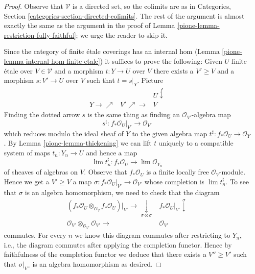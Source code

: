 \begin{proof}

Observe that $\mathcal{V}$ is a directed set, so the colimits are
as in Categories, Section \ref{categories-section-directed-colimits}.
The rest of the argument is almost exactly the same as the argument
in the proof of Lemma \ref{pione-lemma-restriction-fully-faithful}; we urge
the reader to skip it.

\medskip\noindent
Since the category of finite \'etale coverings has an
internal hom (Lemma \ref{pione-lemma-internal-hom-finite-etale})
it suffices to prove the following: Given $U$ finite \'etale over
$V \in \mathcal{V}$
and a morphism $t : Y \to U$ over $V$ there exists a $V' \geq V$
and a morphism $s : V' \to U$ over $V$ such that $t = s|_Y$. Picture
$$
\begin{array}{ccc} &  & U \overset{f}{\downarrow} \\ Y \longrightarrow\nearrow & V' \nearrow\longrightarrow & V\end{array}
$$
Finding the dotted arrow $s$ is the same thing as finding an
$\mathcal{O}_{V'}$-algebra map
$$
s^\sharp : f_*\mathcal{O}_U|_{V'} \longrightarrow \mathcal{O}_{V'}
$$
which reduces modulo the ideal sheaf of $Y$ to the given algebra map
$t^\sharp : f_*\mathcal{O}_U \to \mathcal{O}_Y$.
By Lemma \ref{pione-lemma-thickening} we can lift $t$ uniquely to a compatible
system of maps $t_n : Y_n \to U$ and hence a map
$$
\lim t_n^\sharp : f_*\mathcal{O}_U \longrightarrow \lim \mathcal{O}_{Y_n}
$$
of sheaves of algebras on $V$.
Observe that $f_*\mathcal{O}_U$ is a finite locally free
$\mathcal{O}_V$-module. Hence we get a $V' \geq V$ a map
$\sigma : f_*\mathcal{O}_U|_{V'} \to \mathcal{O}_{V'}$
whose completion is $\lim t_n^\sharp$.
To see that $\sigma$ is an algebra homomorphism, we need to check
that the diagram
$$
\begin{array}{cc}(f_*\mathcal{O}_U \otimes_{\mathcal{O}_V} f_*\mathcal{O}_U)|_{V'}
\longrightarrow\underset{\sigma \otimes \sigma}{\downarrow} & f_*\mathcal{O}_U|_{V'} \overset{\sigma}{\downarrow} \\ \mathcal{O}_{V'} \otimes_{\mathcal{O}_{V'}} \mathcal{O}_{V'} \longrightarrow & \mathcal{O}_{V'}\end{array}
$$
commutes. For every $n$ we know this diagram commutes after restricting
to $Y_n$, i.e., the diagram commutes after applying the completion functor.
Hence by faithfulness of the completion functor
we deduce that there exists a $V'' \geq V'$ such that
$\sigma|_{V''}$ is an algebra homomorphism as desired.
\end{proof}

